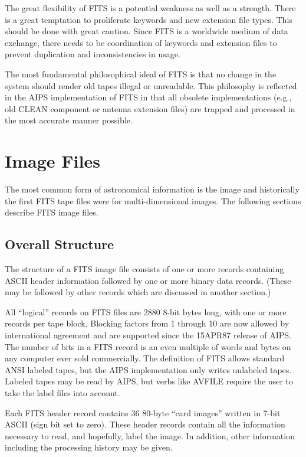 The great flexibility of FITS is a potential weakness as well as a
strength.  There is a great temptation to proliferate keywords and new
extension file types. This should be done with great caution. Since
FITS is a worldwide medium of data exchange, there needs to be
coordination of keywords and extension files to prevent duplication
and inconsistencies in usage.

The most fundamental philosophical ideal of FITS is that no change in
the system should render old tapes illegal or unreadable. This
philosophy is reflected in the AIPS implementation of FITS in that all
obsolete implementations (e.g., old CLEAN component or antenna
extension files) are trapped and processed in the most accurate manner
possible.

\section{Image Files }
The most common form of astronomical information is the image and
historically the first FITS tape files were for multi-dimensional
images.  The following sections describe FITS image files.

\subsection{Overall Structure }
The structure of a FITS image file consists of one or more records
containing ASCII header information followed by one or more binary
data records.  (These may be followed by other records which are
discussed in another section.)

All ``logical'' records on FITS files are 2880 8-bit bytes long, with
one or more records per tape block.  Blocking factors from 1 through
10 are now allowed by international agreement and are supported since the
15APR87 release of AIPS. The number of bits in a FITS record is an
even multiple of words and bytes on any computer ever sold
commercially.  The definition of FITS allows standard ANSI labeled
tapes, but the AIPS implementation only writes unlabeled tapes.
Labeled tapes may be read by AIPS, but verbs like AVFILE require the
user to take the label files into account.

Each FITS header record contains 36 80-byte ``card images'' written in
7-bit ASCII (sign bit set to zero).  These header records contain all
the information necessary to read, and hopefully, label the image.  In
addition, other information including the processing history may be
given.

